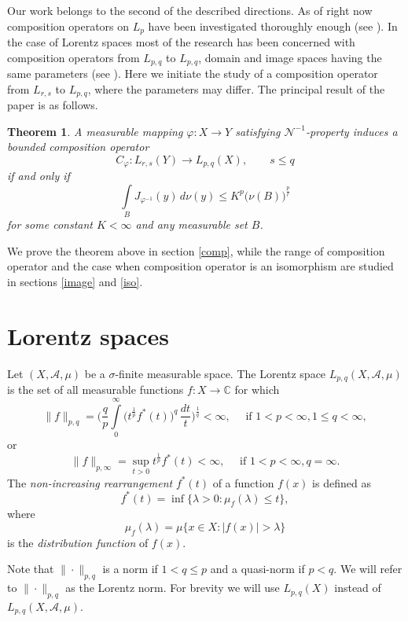 \documentclass{birkjour}
\newtheorem{thm}{Theorem}[section]
\theoremstyle{definition}
\theoremstyle{remark}
\numberwithin{equation}{section}
\begin{document}
Our work belongs to the second of the described directions. 
As of right now composition operators on $L_p$ have been  
investigated thoroughly enough (see \cite{CJ, SM, VU}). 
In the case of Lorentz spaces most of the research has been concerned with 
composition operators from $L_{p,q}$ to $L_{p,q}$, 
domain and image spaces having the same parameters
(see \cite{KK, ADV, KADA}). 
Here we initiate the study of a composition operator from $L_{r,s}$ to $L_{p,q}$,
where the parameters may differ.
The principal result of the paper is as follows. 
\begin{thm}\label{theorem:principal}
A measurable mapping $\varphi:X\to Y$ satisfying $\mathcal N^{-1}$-property 
induces a bounded composition operator 
$$
C_\varphi:L_{r,s}(Y)\to L_{p,q}(X), \qquad s\leq q
$$
if and only if 
$$
\int\limits_BJ_{\varphi^{-1}}(y)\, d\nu(y) \leq K^p\big(\nu(B)\big)^{\frac{p}{r}}
$$
for some constant $K<\infty$ and any measurable set $B$.
\end{thm}
We prove the theorem above in section \ref{comp}, 
while the range of composition operator and the case when composition operator is an isomorphism are studied in sections \ref{image} and \ref{iso}.


\section{Lorentz spaces}

Let $(X,\mathcal A, \mu)$ be a $\sigma$-finite measurable space.
The Lorentz space $L_{p,q}(X,\mathcal A, \mu)$  is the set of all measurable functions $f:X\to\mathbb{C}$
for which
$$
\|f\|_{p,q} = \Bigg(\frac{q}{p}\int\limits_{0}^{\infty}\big(t^{\frac{1}{p}}f^*(t)\big)^q\,\frac{dt}{t}\Bigg)^{\frac{1}{q}} < \infty, \quad \text{ if } 1<p<\infty, 1\leq q<\infty,
$$
or
$$
\|f\|_{p,\infty} = \sup\limits_{t>0}t^{\frac{1}{p}}f^*(t)<\infty, \quad \text{ if } 1<p<\infty, q=\infty.
$$
The \textit{non-increasing rearrangement} $f^*(t)$ of a function $f(x)$ is defined as
$$
f^*(t) = \inf\{\lambda>0 : \mu_{f}(\lambda)\leq t\},
$$  
where
$$
\mu_{f}(\lambda) = \mu\{x\in X : |f(x)|>\lambda\}
$$
is the \textit{distribution function} of $f(x)$.

Note that $\|\cdot\|_{p,q}$ is a norm if $1<q\leq p$ and a quasi-norm if $p<q$.
We will refer to $\|\cdot\|_{p,q}$ as the Lorentz norm. 
For brevity we will use $L_{p,q}(X)$ instead of $L_{p,q}(X,\mathcal A, \mu)$.
\end{document}
